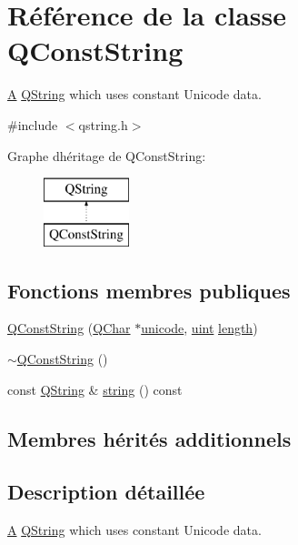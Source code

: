\hypertarget{class_q_const_string}{}\section{Référence de la classe Q\+Const\+String}
\label{class_q_const_string}


\hyperlink{class_a}{A} \hyperlink{class_q_string}{Q\+String} which uses constant Unicode data.  




{\ttfamily \#include $<$qstring.\+h$>$}

Graphe d\textquotesingle{}héritage de Q\+Const\+String\+:\begin{figure}[H]
\begin{center}
\leavevmode
\includegraphics[height=2.000000cm]{class_q_const_string}
\end{center}
\end{figure}
\subsection*{Fonctions membres publiques}
\begin{DoxyCompactItemize}
\item 
\hyperlink{class_q_const_string_afb12679c48e62fbd2ffc14f9ef8b9159}{Q\+Const\+String} (\hyperlink{class_q_char}{Q\+Char} $\ast$\hyperlink{class_q_string_a90243c19cde0be976d0f498db7f7e53a}{unicode}, \hyperlink{qglobal_8h_a4d3943ddea65db7163a58e6c7e8df95a}{uint} \hyperlink{class_q_string_a131b10981e8c68c2d291934c140be464}{length})
\item 
\hyperlink{class_q_const_string_a60c8ed0e36b404ed3d39ab399033facc}{$\sim$\+Q\+Const\+String} ()
\item 
const \hyperlink{class_q_string}{Q\+String} \& \hyperlink{class_q_const_string_a43a40c24f709aef5c3a10736b958341c}{string} () const 
\end{DoxyCompactItemize}
\subsection*{Membres hérités additionnels}


\subsection{Description détaillée}
\hyperlink{class_a}{A} \hyperlink{class_q_string}{Q\+String} which uses constant Unicode data. 


